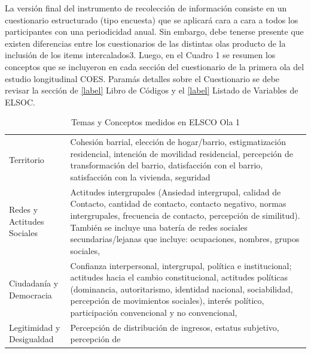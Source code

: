 \documentclass[
]{book}
\begin{document}
La versión final del instrumento de recolección de información consiste en un cuestionario estructurado (tipo encuesta) que se aplicará cara a cara a todos los participantes con una periodicidad anual. Sin embargo, debe tenerse presente que existen diferencias entre los cuestionarios de las distintas olas producto de la inclusión de los items intercalados3. Luego, en el Cuadro 1 se resumen los conceptos que se incluyeron en cada sección del cuestionario de la primera ola del estudio longitudinal COES. Paramás detalles sobre el Cuestionario se debe revisar la sección de \ref{label} Libro de Códigos y el \ref{label} Listado de Variables de ELSOC.

\begin{table}

\caption{\label{tab:unnamed-chunk-2}\label{tab:temas_conceptos}Temas y Conceptos medidos en ELSCO Ola 1}
\centering
\begin{tabular}[t]{>{\raggedright\arraybackslash}p{6cm}>{\raggedright\arraybackslash}p{14cm}}
\toprule
\cellcolor{white}{Sección} & \cellcolor{white}{Temas}\\
\midrule
Territorio & Cohesión barrial, elección de hogar/barrio, estigmatización residencial,   
                          intención de movilidad residencial, percepción de transformación del
                          barrio, datisfacción con el barrio, satisfacción con la vivienda, seguridad
\cellcolor{white}{                          del Barrio, sociabilidad barrial, transporte y violencia barrial.}\\
Redes y Actitudes Sociales & Actitudes intergrupales (Ansiedad intergrupal, calidad de Contacto, cantidad de contacto,
            contacto negativo, normas intergrupales, frecuencia
            de contacto, percepción de similitud). También se incluye una batería de
            redes sociales secundarias/lejanas que incluye: ocupaciones, nombres, grupos sociales,
\cellcolor{white}{            relación con las ocupaciones, etc.}\\
Ciudadanía y Democracia & Confianza interpersonal, intergrupal, política e institucional; actitudes hacia el cambio
          constitucional, actitudes políticas (dominancia, autoritarismo,
          identidad nacional, sociabilidad, percepción de movimientos
          sociales), interés político, participación convencional y no convencional,
\cellcolor{white}{          satisfacción y actitudes hacia la democracia, posición política.}\\
Legitimidad y Desigualdad & Percepción de distribución de ingresos, estatus subjetivo, percepción de

\end{tabular}
\end{table}
\end{document}
